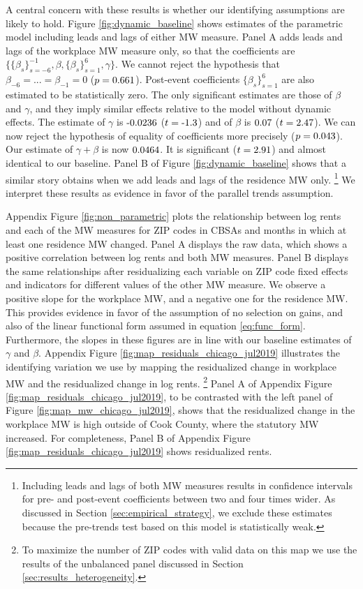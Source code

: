 A central concern with these results is whether our identifying assumptions are 
likely to hold.
Figure \ref{fig:dynamic_baseline} shows estimates of the parametric model 
including leads and lags of either MW measure.
Panel A adds leads and lags of the workplace MW measure only, so that
the coefficients are
$\{\{\beta_s\}_{s=-6}^{-1},\beta,\{\beta_s\}_{s=1}^6,\gamma\}$.
We cannot reject the hypothesis that $\beta_{-6}=...=\beta_{-1}=0$ 
($p = \textnormal{0.661}$).
Post-event coefficients $\{\beta_s\}_{s=1}^6$ are also estimated to be 
statistically zero.
The only significant estimates are those of $\beta$ and $\gamma$, and they imply
similar effects relative to the model without dynamic effects.
The estimate of $\gamma$ is $\textnormal{-0.0236}$ 
($t=\textnormal{-1.3}$) and of $\beta$ is $\textnormal{0.07}$ 
($t=\textnormal{2.47}$).
We can now reject the hypothesis of equality of coefficients more precisely 
($p = \textnormal{0.043}$).
Our estimate of $\gamma+\beta$ is now $\textnormal{0.0464}$.
It is significant ($t=\textnormal{2.91}$) and almost identical to our 
baseline.
Panel B of Figure \ref{fig:dynamic_baseline} shows that a similar story 
obtains when we add leads and lags of the residence MW only.%
\footnote{Including leads and lags of both MW measures results in confidence 
intervals for pre- and post-event coefficients between two and four times wider.
As discussed in Section \ref{sec:empirical_strategy}, we exclude these estimates 
because the pre-trends test based on this model is statistically weak.}
We interpret these results as evidence in favor of the parallel trends assumption.

Appendix Figure \ref{fig:non_parametric} plots the relationship between 
log rents and each of the MW measures for ZIP codes in CBSAs and months 
in which at least one residence MW changed.
Panel A displays the raw data, which shows a positive correlation between log 
rents and both MW measures.
Panel B displays the same relationships after residualizing each variable on 
ZIP code fixed effects and indicators for different values of the other MW 
measure.
We observe a positive slope for the workplace MW, and a negative one for
the residence MW.
This provides evidence in favor of the assumption of no selection on gains, and
also of the linear functional form assumed in equation \eqref{eq:func_form}. 
Furthermore, the slopes in these figures are in line with our baseline estimates
of $\gamma$ and $\beta$.
Appendix Figure \ref{fig:map_residuals_chicago_jul2019} illustrates the 
identifying variation we use by mapping the residualized change in workplace MW 
and the residualized change in log rents.%
\footnote{To maximize the number of ZIP codes with valid data on this map we
use the results of the unbalanced panel discussed in Section 
\ref{sec:results_heterogeneity}.}
Panel A of Appendix Figure \ref{fig:map_residuals_chicago_jul2019}, to be 
contrasted with the left panel of Figure \ref{fig:map_mw_chicago_jul2019}, 
shows that the residualized change in the workplace MW is high outside of Cook 
County, where the statutory MW increased.
For completeness, Panel B of Appendix Figure 
\ref{fig:map_residuals_chicago_jul2019} shows residualized rents.

